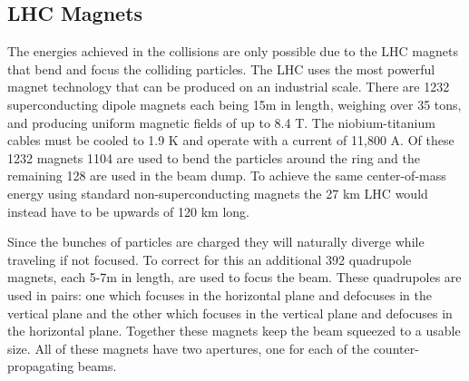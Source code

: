 \subsection{LHC Magnets}
The energies achieved in the collisions are only possible due to the LHC magnets that bend and focus the colliding particles.  The LHC uses the most powerful magnet technology that can be produced on an industrial scale.  There are 1232 superconducting dipole magnets each being 15m in length, weighing over 35 tons, and producing uniform magnetic fields of up to 8.4 T.  The niobium-titanium cables must be cooled to 1.9 K and operate with a current of 11,800 A.  Of these 1232 magnets 1104 are used to bend the particles around the ring and the remaining 128 are used in the beam dump.  To achieve the same center-of-mass energy using standard non-superconducting magnets the 27 km LHC would instead have to be upwards of 120 km long.

Since the bunches of particles are charged they will naturally diverge while traveling if not focused.  To correct for this an additional 392 quadrupole magnets, each 5-7m in length, are used to focus the beam.  These quadrupoles are used in pairs: one which focuses in the horizontal plane and defocuses in the vertical plane and the other which focuses in the vertical plane and defocuses in the horizontal plane.  Together these magnets keep the beam squeezed to a usable size.  All of these magnets have two apertures, one for each of the counter-propagating beams.


